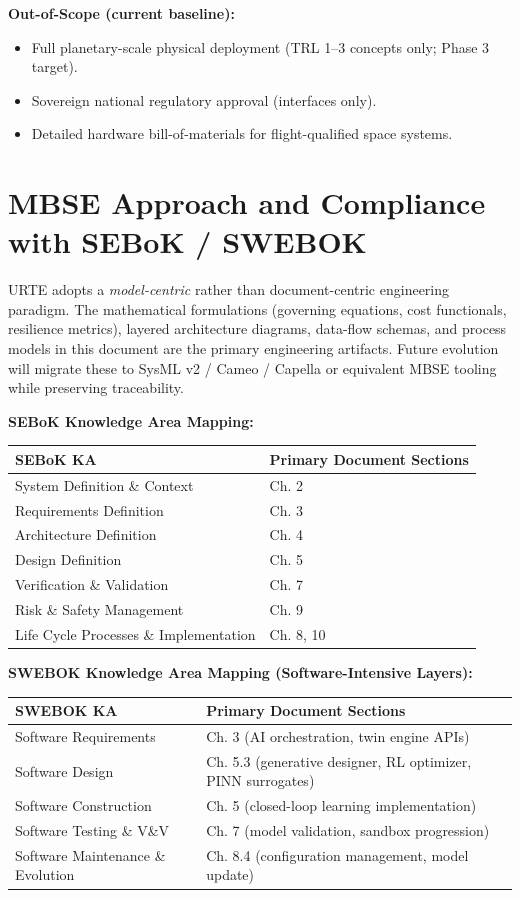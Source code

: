 \documentclass[11pt,a4paper]{report}
\begin{document}
\textbf{Out-of-Scope (current baseline):}
\begin{itemize}
    \item Full planetary-scale physical deployment (TRL 1--3 concepts only; Phase 3 target).
    \item Sovereign national regulatory approval (interfaces only).
    \item Detailed hardware bill-of-materials for flight-qualified space systems.
\end{itemize}

\section{MBSE Approach and Compliance with SEBoK / SWEBOK}

URTE adopts a \textit{model-centric} rather than document-centric engineering paradigm. The mathematical formulations (governing equations, cost functionals, resilience metrics), layered architecture diagrams, data-flow schemas, and process models in this document are the primary engineering artifacts. Future evolution will migrate these to SysML v2 / Cameo / Capella or equivalent MBSE tooling while preserving traceability.

\textbf{SEBoK Knowledge Area Mapping:}

\begin{tabular}{>{\raggedright\arraybackslash}p{5.5cm} p{8cm}}
\toprule
\textbf{SEBoK KA} & \textbf{Primary Document Sections} \\
\midrule
System Definition \& Context & Ch. 2 \\
Requirements Definition & Ch. 3 \\
Architecture Definition & Ch. 4 \\
Design Definition & Ch. 5 \\
Verification \& Validation & Ch. 7 \\
Risk \& Safety Management & Ch. 9 \\
Life Cycle Processes \& Implementation & Ch. 8, 10 \\
\bottomrule
\end{tabular}

\textbf{SWEBOK Knowledge Area Mapping (Software-Intensive Layers):}

\begin{tabular}{>{\raggedright\arraybackslash}p{5.5cm} p{8cm}}
\toprule
\textbf{SWEBOK KA} & \textbf{Primary Document Sections} \\
\midrule
Software Requirements & Ch. 3 (AI orchestration, twin engine APIs) \\
Software Design & Ch. 5.3 (generative designer, RL optimizer, PINN surrogates) \\
Software Construction & Ch. 5 (closed-loop learning implementation) \\
Software Testing \& V\&V & Ch. 7 (model validation, sandbox progression) \\
Software Maintenance \& Evolution & Ch. 8.4 (configuration management, model update) \\
\bottomrule
\end{tabular}
\end{document}
